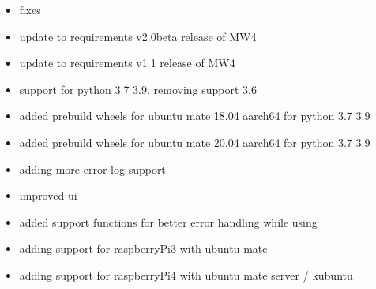 \documentclass[a4paper,10pt,english]{sphinxmanual}
\begin{document}
\begin{itemize}
\item {} 
\sphinxAtStartPar
fixes

\end{itemize}

\begin{itemize}
\item {} 
\sphinxAtStartPar
update to requirements v2.0beta release of MW4

\end{itemize}

\begin{itemize}
\item {} 
\sphinxAtStartPar
update to requirements v1.1 release of MW4

\end{itemize}

\begin{itemize}
\item {} 
\sphinxAtStartPar
support for python 3.7 \sphinxhyphen{} 3.9, removing support 3.6

\item {} 
\sphinxAtStartPar
added prebuild wheels for ubuntu mate 18.04 aarch64 for python 3.7 \sphinxhyphen{} 3.9

\item {} 
\sphinxAtStartPar
added prebuild wheels for ubuntu mate 20.04 aarch64 for python 3.7 \sphinxhyphen{} 3.9

\end{itemize}

\begin{itemize}
\item {} 
\sphinxAtStartPar
adding more error log support

\item {} 
\sphinxAtStartPar
improved ui

\end{itemize}

\begin{itemize}
\item {} 
\sphinxAtStartPar
added support functions for better error handling while using

\end{itemize}

\begin{itemize}
\item {} 
\sphinxAtStartPar
adding support for raspberryPi3 with ubuntu mate

\item {} 
\sphinxAtStartPar
adding support for raspberryPi4 with ubuntu mate server / kubuntu

\end{itemize}
\end{document}
